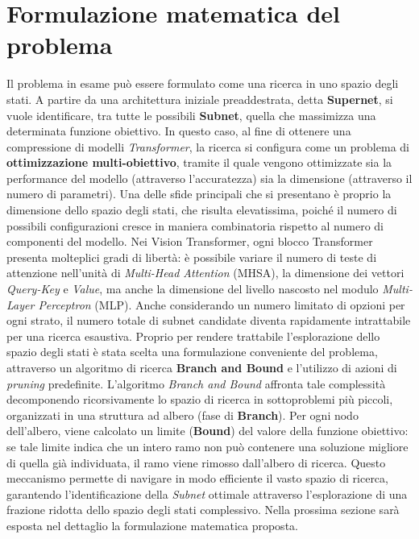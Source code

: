 \chapter{Formulazione matematica del problema}
\label{cap:teoria}
Il problema in esame può essere formulato come una ricerca in uno
spazio degli stati. A partire da una architettura iniziale preaddestrata, detta
\textbf{Supernet}, si vuole identificare, tra tutte le possibili \textbf{Subnet},
quella che massimizza una determinata funzione obiettivo. In questo caso, al
fine di ottenere una compressione di modelli \textit{Transformer}, la ricerca
si configura come un problema di \textbf{ottimizzazione multi-obiettivo},
tramite il quale vengono ottimizzate sia la performance del modello (attraverso
l'accuratezza) sia la dimensione (attraverso il numero di parametri).
\newline
Una delle sfide principali che si presentano è proprio la dimensione dello
spazio degli stati, che risulta elevatissima, poiché il numero di possibili
configurazioni cresce in maniera combinatoria rispetto al numero di componenti
del modello. Nei Vision Transformer, ogni blocco Transformer presenta
molteplici gradi di libertà: è possibile variare il numero di teste di
attenzione nell'unità di \textit{Multi-Head Attention} (MHSA), la dimensione
dei vettori \textit{Query-Key} e \textit{Value}, ma anche la dimensione del
livello nascosto nel modulo \textit{Multi-Layer Perceptron} (MLP). Anche considerando un numero limitato di opzioni per ogni strato, il numero
totale di subnet candidate diventa rapidamente intrattabile per una ricerca
esaustiva. \newline Proprio per rendere trattabile l'esplorazione dello spazio
degli stati è stata scelta una formulazione conveniente del problema,
attraverso un algoritmo di ricerca \textbf{Branch and Bound} \cite{BranchAndBound} e l'utilizzo di
azioni di \textit{pruning} predefinite. L'algoritmo \textit{Branch and Bound} affronta tale complessità decomponendo ricorsivamente lo spazio di ricerca in sottoproblemi più piccoli, organizzati in una struttura ad albero (fase di \textbf{Branch}). Per ogni nodo dell'albero, viene calcolato un limite (\textbf{Bound}) del valore della funzione obiettivo: se tale limite indica che un intero ramo non può contenere una soluzione migliore di quella già individuata, il ramo viene rimosso dall'albero di ricerca. Questo meccanismo permette di navigare in modo efficiente il vasto spazio di ricerca, garantendo l'identificazione della \textit{Subnet} ottimale attraverso l'esplorazione di una frazione ridotta dello spazio degli stati complessivo.
Nella prossima sezione sarà esposta nel dettaglio la formulazione matematica proposta.\newline

